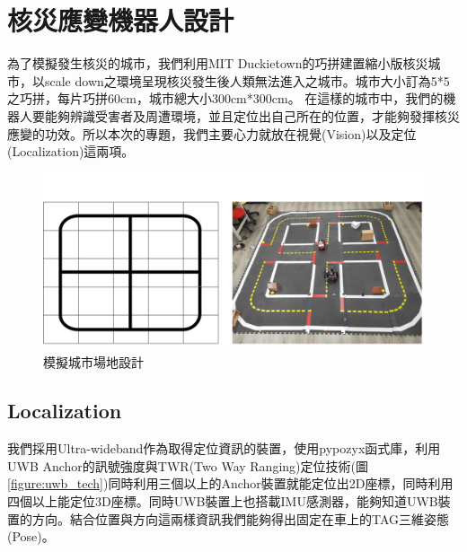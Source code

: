 \section{核災應變機器人設計}
為了模擬發生核災的城市，我們利用MIT Duckietown的巧拼建置縮小版核災城市，以scale down之環境呈現核災發生後人類無法進入之城市。城市大小訂為5*5之巧拼，每片巧拼60cm，城市總大小300cm*300cm。
在這樣的城市中，我們的機器人要能夠辨識受害者及周遭環境，並且定位出自己所在的位置，才能夠發揮核災應變的功效。所以本次的專題，我們主要心力就放在視覺(Vision)以及定位(Localization)這兩項。

\begin{figure}[h]
  \centering
    \includegraphics[width=\columnwidth]{images/field.png}
        \caption{模擬城市場地設計}
 \label{figure:field}
\end{figure}

\subsection{Localization}
我們採用Ultra-wideband作為取得定位資訊的裝置，使用pypozyx函式庫，利用UWB Anchor的訊號強度與TWR(Two Way Ranging)定位技術(圖\ref{figure:uwb_tech})同時利用三個以上的Anchor裝置就能定位出2D座標，同時利用四個以上能定位3D座標。同時UWB裝置上也搭載IMU感測器，能夠知道UWB裝置的方向。結合位置與方向這兩樣資訊我們能夠得出固定在車上的TAG三維姿態(Pose)。

